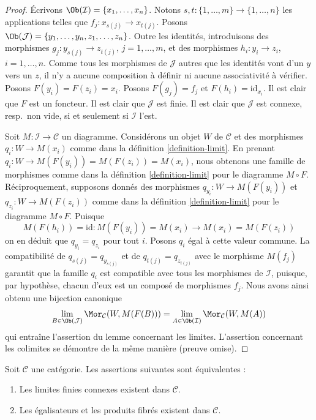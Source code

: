 \begin{proof}
Écrivons $\Ob(\mathcal{I}) = \{x_1, \ldots, x_n\}$.
Notons $s, t : \{1, \ldots, m\} \to \{1, \ldots, n\}$ les applications
telles que $f_j : x_{s(j)} \to x_{t(j)}$.
Posons $\Ob(\mathcal{J}) = \{y_1, \ldots, y_n, z_1, \ldots, z_n\}$.
Outre les identités, introduisons des morphismes
$g_j : y_{s(j)} \to z_{t(j)}$, $j = 1, \ldots, m$, et des morphismes
$h_i : y_i \to z_i$, $i = 1, \ldots, n$. Comme tous les morphismes de
$\mathcal{J}$ autres que les identités vont d'un $y$ vers un $z$, il n'y a
aucune composition à définir ni aucune associativité à vérifier.
Posons $F(y_i) = F(z_i) = x_i$. Posons
$F(g_j) = f_j$ et $F(h_i) = \text{id}_{x_i}$.
Il est clair que $F$ est un foncteur.
Il est clair que $\mathcal{J}$ est finie.
Il est clair que $\mathcal{J}$ est connexe, resp.\ non vide,
si et seulement si $\mathcal{I}$ l'est.

\medskip\noindent
Soit $M : \mathcal{I} \to \mathcal{C}$ un diagramme.
Considérons un objet $W$ de $\mathcal{C}$ et des morphismes
$q_i : W \to M(x_i)$ comme dans la
définition \ref{definition-limit}.
En prenant $q_i : W \to M(F(y_i)) = M(F(z_i)) = M(x_i)$, nous obtenons
une famille de morphismes comme dans la
définition \ref{definition-limit}
pour le diagramme $M \circ F$.
Réciproquement, supposons donnés des morphismes
$q_{y_i} : W \to M(F(y_i))$ et $q_{z_i} : W \to M(F(z_i))$
comme dans la définition \ref{definition-limit}
pour le diagramme $M \circ F$. Puisque
$$
M(F(h_i)) = \text{id} : M(F(y_i)) = M(x_i) \longrightarrow M(x_i) = M(F(z_i))
$$
on en déduit que $q_{y_i} = q_{z_i}$ pour tout $i$. Posons $q_i$ égal à
cette valeur commune. La compatibilité de
$q_{s(j)} = q_{y_{s(j)}}$ et de $q_{t(j)} = q_{z_{t(j)}}$ avec le morphisme
$M(f_j)$ garantit que la famille $q_i$ est compatible avec tous les
morphismes de $\mathcal{I}$, puisque, par hypothèse, chacun d'eux est un
composé de morphismes $f_j$. Nous avons ainsi obtenu une bijection canonique
$$
\lim_{B \in \Ob(\mathcal{J})} \Mor_\mathcal{C}(W, M(F(B)))
=
\lim_{A \in \Ob(\mathcal{I})} \Mor_\mathcal{C}(W, M(A))
$$
qui entraîne l'assertion du lemme concernant les limites. L'assertion
concernant les colimites se démontre de la même manière (preuve omise).
\end{proof}

\begin{lemma}
\label{lemma-fibre-products-equalizers-exist}
Soit $\mathcal{C}$ une catégorie.
Les assertions suivantes sont équivalentes :
\begin{enumerate}
\item Les limites finies connexes existent dans $\mathcal{C}$.
\item Les égalisateurs et les produits fibrés existent dans $\mathcal{C}$.
\end{enumerate}
\end{lemma}

